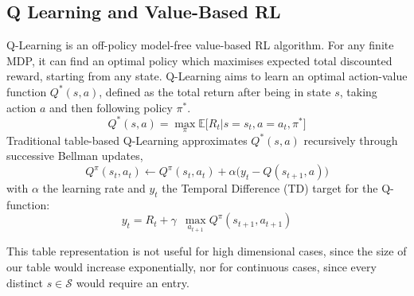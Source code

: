 \documentclass[a4paper, conference]{IEEEtran}
\begin{document}
\subsection{Q Learning and Value-Based RL}
Q-Learning\cite{watkins} is an off-policy model-free value-based RL algorithm. For any finite MDP, it can find an optimal policy which maximises expected total discounted reward, starting from any state\cite{melo}.
Q-Learning aims to learn an optimal action-value function $Q^*(s,a)$, defined as the total return after being in state $s$, taking action $a$ and then following policy $\pi^*$. %
\begin{equation}
Q^*(s,a) = \max_{\pi} \mathbb{E} \big[ R_t | s=s_t, a=a_t, \pi^* \big]
\label{eq:qlearning}
\end{equation}
Traditional table-based Q-Learning approximates $Q^*(s,a)$ recursively through successive Bellman updates,
\begin{equation}
Q^{\pi}(s_t,a_t) \leftarrow Q^{\pi}(s_t,a_t) + \alpha \big( y_t - Q(s_{t+1},a) \big)
\label{eq:bellmanupdate}
\end{equation}
with $\alpha$ the learning rate and $y_t$ the Temporal Difference (TD) target for the Q-function:
\begin{equation}
y_t = R_t + \gamma \,\,\, \max_{a_{t+1}} Q^{\pi}(s_{t+1},a_{t+1})
\end{equation}

This table representation is not useful for high dimensional cases, since the size of our table would increase exponentially, nor for continuous cases, since every distinct $s\in\mathcal{S}$ would require an entry.

\end{document}
